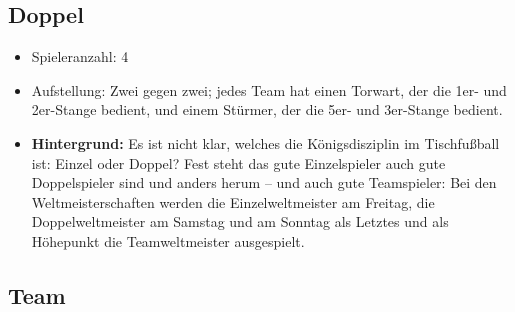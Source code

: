 \subsection{Doppel}
\label{spielformen:npersonen:doppel}

\begin{itemize}
\item Spieleranzahl: 4
\item Aufstellung: Zwei gegen zwei; jedes Team hat einen Torwart, der die 1er- und 2er-Stange bedient, und einem Stürmer, der die 5er- und 3er-Stange bedient.
\item {\normalfont \bfseries Hintergrund:} Es ist nicht klar, welches die Königsdisziplin im Tischfußball ist: Einzel oder Doppel? Fest steht das gute Einzelspieler auch gute Doppelspieler sind und anders herum -- und auch gute Teamspieler: 
Bei den Weltmeisterschaften werden die Einzelweltmeister am Freitag, die Doppelweltmeister am Samstag und am Sonntag als Letztes und als Höhepunkt die Teamweltmeister ausgespielt. 
\end{itemize}

\subsection{Team}
\label{spielformen:npersonen:team}

